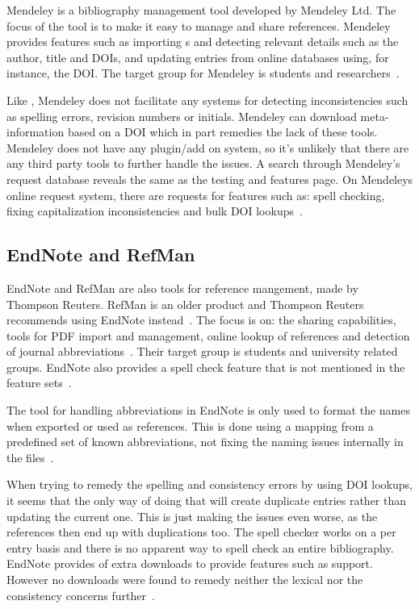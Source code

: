 Mendeley is a bibliography management tool developed by Mendeley Ltd.
The focus of the tool is to make it easy to manage and share
references.  Mendeley provides features such as importing s
and detecting relevant details such as the author, title and DOIs, and
updating entries from online databases using, for instance, the DOI.
The target group for Mendeley is students and
researchers~\cite{mendeley_features}.

Like {\bibtex}, Mendeley does not facilitate any systems for detecting
inconsistencies such as spelling errors, revision numbers or initials.
Mendeley can download meta-information based on a DOI which in part
remedies the lack of these tools.  Mendeley does not have any
plugin/add on system, so it's unlikely that there are any third party
tools to further handle the {\bibtex} issues. A search through
Mendeley's request database reveals the same as the testing and
features page.  On Mendeleys online request system, there are requests
for features such as: spell checking, fixing capitalization
inconsistencies and bulk DOI
lookups~\cite{mendeley_request_spellcheck, mendeley_request_lowercase,
  mendeley_request_capitalization, mendeley_request_bulk_doi}.

\subsection{EndNote and RefMan}
EndNote and RefMan are also tools for reference mangement, made by
Thompson Reuters.  RefMan is an older product and Thompson Reuters
recommends using EndNote instead~\cite{refman_switch,
  refman_features}.  The focus is on: the sharing capabilities, tools
for PDF import and management, online lookup of references and
detection of journal abbreviations~\cite{endnote_basic_features,
  endnote_x7_features}.  Their target group is students and university
related groups.  EndNote also provides a spell check feature that is
not mentioned in the feature sets~\cite{endnote_spellcheck}.

The tool for handling abbreviations in EndNote is only used to format
the names when exported or used as references.  This is done using a
mapping from a predefined set of known abbreviations, not fixing the
naming issues internally in the files~\cite{endnote_terms_journals}.

When trying to remedy the spelling and consistency errors by using DOI
lookups, it seems that the only way of doing that will create
duplicate entries rather than updating the current one. This is just
making the issues even worse, as the references then end up with
duplications too.  The spell checker works on a per entry basis and
there is no apparent way to spell check an entire bibliography.
EndNote provides of extra downloads to provide features such as
{\bibtex} support.  However no downloads were found to remedy neither
the lexical nor the consistency concerns
further~\cite{endnote_downloads}.


